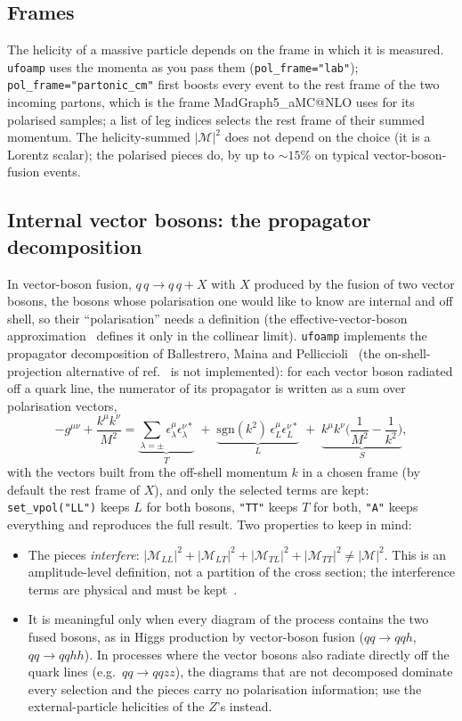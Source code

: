 \documentclass[11pt]{article}
\makeatletter
\newcommand{\ufoamp}{\texttt{ufoamp}}
\newcommand{\mg}{MadGraph5\_aMC@NLO}
\newcommand{\code}[1]{\texttt{#1}}
\newcommand{\M}{\mathcal{M}}
\makeatother
\begin{document}
\subsection{Frames}\label{sec:frames}
The helicity of a massive particle depends on the frame in which it is measured. \ufoamp{} uses the momenta as you pass them (\code{pol\_frame="lab"}); \code{pol\_frame="partonic\_cm"} first boosts every event to the rest frame of the two incoming partons, which is the frame \mg{} uses for its polarised samples; a list of leg indices selects the rest frame of their summed momentum. The helicity-summed $|\M|^2$ does not depend on the choice (it is a Lorentz scalar); the polarised pieces do, by up to $\sim15\%$ on typical vector-boson-fusion events.

\subsection{Internal vector bosons: the propagator decomposition}\label{sec:vpol}
In vector-boson fusion, $q\,q\to q\,q + X$ with $X$ produced by the fusion of two vector bosons, the bosons whose polarisation one would like to know are internal and off shell, so their ``polarisation'' needs a definition (the effective-vector-boson approximation~\cite{Kane:1984bb,Dawson:1984gx} defines it only in the collinear limit). \ufoamp{} implements the propagator decomposition of Ballestrero, Maina and Pelliccioli~\cite{Ballestrero:2017bxn,Ballestrero:2019qoy} (the on-shell-projection alternative of ref.~\cite{Denner:2020bcz} is not implemented): for each vector boson radiated off a quark line, the numerator of its propagator is written as a sum over polarisation vectors,
\[
-g^{\mu\nu}+\frac{k^\mu k^\nu}{M^2}=\underbrace{\sum_{\lambda=\pm}\epsilon_\lambda^\mu\epsilon_\lambda^{\nu*}}_{T}\;+\;\underbrace{\mathrm{sgn}(k^2)\,\epsilon_L^\mu\epsilon_L^{\nu*}}_{L}\;+\;\underbrace{k^\mu k^\nu\Big(\frac{1}{M^2}-\frac{1}{k^2}\Big)}_{S},
\]
with the vectors built from the off-shell momentum $k$ in a chosen frame (by default the rest frame of $X$), and only the selected terms are kept: \code{set\_vpol("LL")} keeps $L$ for both bosons, \code{"TT"} keeps $T$ for both, \code{"A"} keeps everything and reproduces the full result. Two properties to keep in mind:
\begin{itemize}[nosep]
\item The pieces \emph{interfere}: $|\M_{LL}|^2+|\M_{LT}|^2+|\M_{TL}|^2+|\M_{TT}|^2\neq|\M|^2$. This is an amplitude-level definition, not a partition of the cross section; the interference terms are physical and must be kept~\cite{Ballestrero:2019qoy}.
\item It is meaningful only when every diagram of the process contains the two fused bosons, as in Higgs production by vector-boson fusion ($q q\to q q h$, $q q\to q q h h$). In processes where the vector bosons also radiate directly off the quark lines (e.g.\ $q q\to q q z z$), the diagrams that are not decomposed dominate every selection and the pieces carry no polarisation information; use the external-particle helicities of the $Z$'s instead.
\end{itemize}
\end{document}
